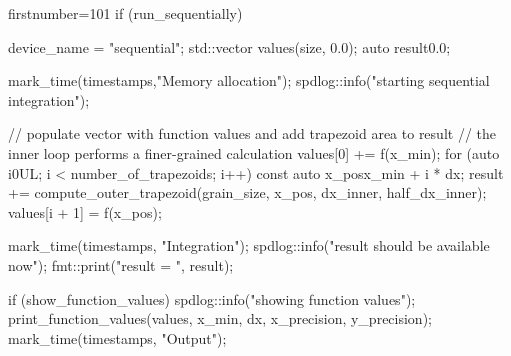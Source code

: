 \begin{cppcode*}{firstnumber=101}
    if (run_sequentially) {
        device_name = "sequential";
        std::vector values(size, 0.0);
        auto result{0.0};

        mark_time(timestamps,"Memory allocation");
        spdlog::info("starting sequential integration");

        // populate vector with function values and add trapezoid area to result
        // the inner loop performs a finer-grained calculation
        values[0] += f(x_min);
        for (auto i{0UL}; i < number_of_trapezoids; i++) {
            const auto x_pos{x_min + i * dx};
            result += compute_outer_trapezoid(grain_size, x_pos, dx_inner, half_dx_inner);
            values[i + 1] = f(x_pos);
        }

        mark_time(timestamps, "Integration");
        spdlog::info("result should be available now");
        fmt::print("result = {}\n", result);

        if (show_function_values) {
            spdlog::info("showing function values");
            print_function_values(values, x_min, dx, x_precision, y_precision);
            mark_time(timestamps, "Output");
        }
    }
\end{cppcode*}
